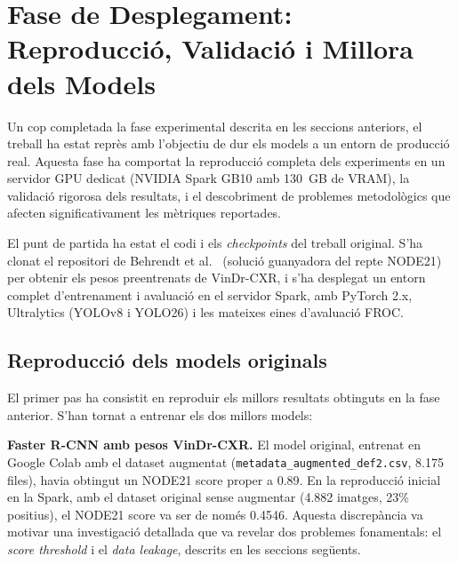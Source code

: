 
\section{Fase de Desplegament: Reproducció, Validació i Millora dels Models}

Un cop completada la fase experimental descrita en les seccions anteriors, el treball ha estat reprès amb l'objectiu de dur els models a un entorn de producció real. Aquesta fase ha comportat la reproducció completa dels experiments en un servidor GPU dedicat (NVIDIA Spark GB10 amb 130~GB de VRAM), la validació rigorosa dels resultats, i el descobriment de problemes metodològics que afecten significativament les mètriques reportades.

El punt de partida ha estat el codi i els \textit{checkpoints} del treball original. S'ha clonat el repositori de Behrendt et al.~\cite{behrendt2023node21} (solució guanyadora del repte NODE21) per obtenir els pesos preentrenats de VinDr-CXR, i s'ha desplegat un entorn complet d'entrenament i avaluació en el servidor Spark, amb PyTorch 2.x, Ultralytics (YOLOv8 i YOLO26) i les mateixes eines d'avaluació FROC.

\subsection{Reproducció dels models originals}

El primer pas ha consistit en reproduir els millors resultats obtinguts en la fase anterior. S'han tornat a entrenar els dos millors models:

\textbf{Faster R-CNN amb pesos VinDr-CXR.} El model original, entrenat en Google Colab amb el dataset augmentat (\texttt{metadata\_augmented\_def2.csv}, 8.175 files), havia obtingut un NODE21 score proper a 0.89. En la reproducció inicial en la Spark, amb el dataset original sense augmentar (4.882 imatges, 23\% positius), el NODE21 score va ser de només 0.4546. Aquesta discrepància va motivar una investigació detallada que va revelar dos problemes fonamentals: el \textit{score threshold} i el \textit{data leakage}, descrits en les seccions següents.

